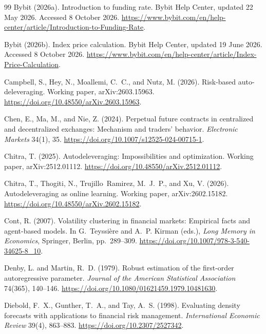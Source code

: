\documentclass[10pt,a4paper]{article}
\begin{document}
\begin{thebibliography}{99}
Bybit (2026a).
\newblock Introduction to funding rate. Bybit Help Center, updated 22 May 2026. Accessed 8 October 2026.
\newblock \url{https://www.bybit.com/en/help-center/article/Introduction-to-Funding-Rate}.

Bybit (2026b).
\newblock Index price calculation. Bybit Help Center, updated 19 June 2026. Accessed 8 October 2026.
\newblock \url{https://www.bybit.com/en/help-center/article/Index-Price-Calculation}.

Campbell, S., Hey, N., Moallemi, C.~C., and Nutz, M. (2026).
\newblock Risk-based auto-deleveraging.
\newblock Working paper, arXiv:2603.15963.
\newblock \url{https://doi.org/10.48550/arXiv.2603.15963}.

Chen, E., Ma, M., and Nie, Z. (2024).
\newblock Perpetual future contracts in centralized and decentralized exchanges: Mechanism and traders' behavior.
\newblock \textit{Electronic Markets} 34(1), 35.
\newblock \url{https://doi.org/10.1007/s12525-024-00715-1}.

Chitra, T. (2025).
\newblock Autodeleveraging: Impossibilities and optimization.
\newblock Working paper, arXiv:2512.01112.
\newblock \url{https://doi.org/10.48550/arXiv.2512.01112}.

Chitra, T., Thogiti, N., Trujillo~Ramirez, M.~J.~P., and Xu, V. (2026).
\newblock Autodeleveraging as online learning.
\newblock Working paper, arXiv:2602.15182.
\newblock \url{https://doi.org/10.48550/arXiv.2602.15182}.

Cont, R. (2007).
\newblock Volatility clustering in financial markets: Empirical facts and agent-based models.
\newblock In G.~Teyssi\`ere and A.~P. Kirman (eds.), \textit{Long Memory in Economics},
  Springer, Berlin, pp.~289--309.
\newblock \url{https://doi.org/10.1007/978-3-540-34625-8_10}.

Denby, L. and Martin, R.~D. (1979).
\newblock Robust estimation of the first-order autoregressive parameter.
\newblock \textit{Journal of the American Statistical Association} 74(365), 140--146.
\newblock \url{https://doi.org/10.1080/01621459.1979.10481630}.

Diebold, F.~X., Gunther, T.~A., and Tay, A.~S. (1998).
\newblock Evaluating density forecasts with applications to financial risk management.
\newblock \textit{International Economic Review} 39(4), 863--883.
\newblock \url{https://doi.org/10.2307/2527342}.


\end{thebibliography}
\end{document}
